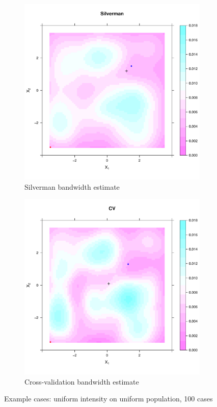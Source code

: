 \begin{figure}[htbp]
    \begin{subfigure}[b]{0.45\textwidth}
    \includegraphics[width=\textwidth]{results/unif_100_unif/output/silverman_intensity_heatmap}
    \caption{Silverman bandwidth estimate}
    \end{subfigure}%
    \begin{subfigure}[b]{0.45\textwidth}
    \includegraphics[width=\textwidth]{results/unif_100_unif/output/CV_intensity_heatmap}
    \caption{Cross-validation bandwidth estimate}
    \end{subfigure}
    \caption{Example cases: uniform intensity on uniform population, 100 cases}
    \label{fig:cases:unif_100_unif}
\end{figure}

